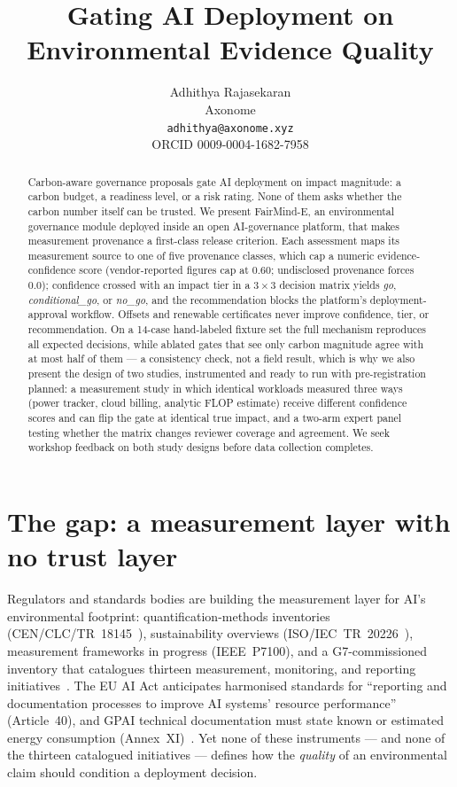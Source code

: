 \documentclass[10pt]{article}
\title{\vspace{-1.2em}\textbf{Gating AI Deployment on Environmental Evidence Quality}}
\author{
  Adhithya Rajasekaran\\
  Axonome\\
  \texttt{adhithya@axonome.xyz}\\
  \small ORCID 0009-0004-1682-7958
}
\date{}
\begin{document}
\maketitle
\vspace{-2.2em}

\begin{abstract}
Carbon-aware governance proposals gate AI deployment on impact magnitude: a
carbon budget, a readiness level, or a risk rating. None of them asks whether
the carbon number itself can be trusted. We present FairMind-E, an
environmental governance module deployed inside an open AI-governance
platform, that makes measurement provenance a first-class release criterion.
Each assessment maps its measurement source to one of five provenance classes,
which cap a numeric evidence-confidence score (vendor-reported figures cap at
0.60; undisclosed provenance forces 0.0); confidence crossed with an impact
tier in a $3{\times}3$ decision matrix yields \emph{go},
\emph{conditional\_go}, or \emph{no\_go}, and the recommendation blocks the
platform's deployment-approval workflow. Offsets and renewable certificates
never improve confidence, tier, or recommendation. On a 14-case hand-labeled
fixture set the full mechanism reproduces all expected decisions, while
ablated gates that see only carbon magnitude agree with at most half of them
--- a consistency check, not a field result, which is why we also present the
design of two studies, instrumented and ready to run with pre-registration planned: a
measurement study in which identical workloads measured three ways (power
tracker, cloud billing, analytic FLOP estimate) receive different confidence
scores and can flip the gate at identical true impact, and a two-arm expert
panel testing whether the matrix changes reviewer coverage and agreement. We
seek workshop feedback on both study designs before data collection completes.
\end{abstract}

\section{The gap: a measurement layer with no trust layer}

Regulators and standards bodies are building the measurement layer for AI's
environmental footprint: quantification-methods inventories
(CEN/CLC/TR~18145~\cite{cen18145}), sustainability overviews
(ISO/IEC~TR~20226~\cite{iso20226}), measurement frameworks in progress
(IEEE~P7100), and a G7-commissioned inventory that catalogues thirteen
measurement, monitoring, and reporting initiatives~\cite{g7overview}. The EU
AI Act anticipates harmonised standards for ``reporting and documentation
processes to improve AI systems' resource performance'' (Article~40), and
GPAI technical documentation must state known or estimated energy consumption
(Annex~XI)~\cite{euaiact}. Yet none of these instruments --- and none of the
thirteen catalogued initiatives --- defines how the \emph{quality} of an
environmental claim should condition a deployment decision.
\end{document}
